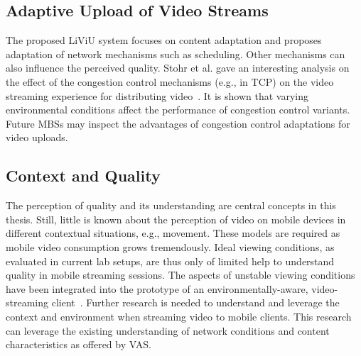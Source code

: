 \subsection{Adaptive Upload of Video Streams}
The proposed \ac{LiViU} system focuses on content adaptation and proposes adaptation of network mechanisms such as scheduling.
Other mechanisms can also influence the perceived quality.
Stohr et al. gave an interesting analysis on the effect of the congestion control mechanisms (e.g., in \ac{TCP}) on the video streaming experience for distributing video~\cite{Stohr2016b}.
It is shown that varying environmental conditions affect the performance of congestion control variants.
Future \ac{MBS}s may inspect the advantages of congestion control adaptations for video uploads.
\subsection{Context and Quality}
The perception of quality and its understanding are central concepts in this thesis.
Still, little is known about the perception of video on mobile devices in different contextual situations, e.g., movement.
These models are required as mobile video consumption grows tremendously.
Ideal viewing conditions, as evaluated in current lab setups, are thus only of limited help to understand quality in mobile streaming sessions.
The aspects of unstable viewing conditions have been integrated into the prototype of an environmentally-aware, video-streaming client~\cite{Wilk2015b}.
Further research is needed to understand and leverage the context and environment when streaming video to mobile clients.
This research can leverage the existing understanding of network conditions and content characteristics as offered by \ac{VAS}.
